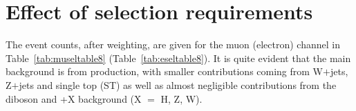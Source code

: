



\section{Effect of selection requirements \label{cutflow}}

The event counts, after weighting, are given for the muon (electron) channel in Table~\ref{tab:museltable8} (Table~\ref{tab:eseltable8}). It is quite evident that the main background is from \ttbar production, with smaller contributions coming from W$+$jets, Z$+$jets and single top (ST) as well as almost negligible contributions from the diboson and \ttbar+X background (X $=$ H, Z, W).




